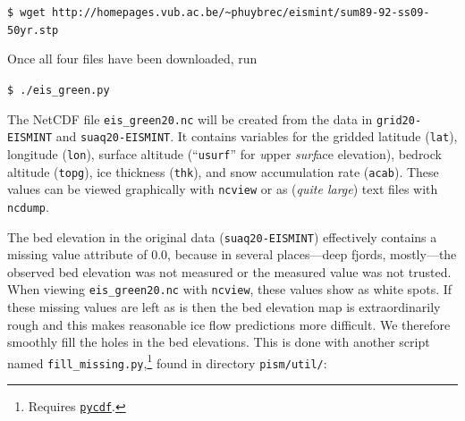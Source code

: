 \documentclass[11pt,final]{amsart}
\begin{document}
\verb|$ wget http://homepages.vub.ac.be/~phuybrec/eismint/sum89-92-ss09-50yr.stp|

\normalsize\noindent Once all four files have been downloaded, run

\verb|$ ./eis_green.py|

\noindent The NetCDF file \verb|eis_green20.nc| will be created from the data in \verb|grid20-EISMINT| and \verb|suaq20-EISMINT|.  It contains variables for the gridded latitude (\verb|lat|), longitude (\verb|lon|), surface altitude (``\verb|usurf|'' for \emph{u}pper \emph{surf}ace elevation), bedrock altitude (\verb|topg|), ice thickness (\verb|thk|), and snow accumulation rate (\verb|acab|).  These values can be viewed graphically with \verb|ncview| or as (\emph{quite large}) text files with \verb|ncdump|.

The bed elevation in the original data (\verb|suaq20-EISMINT|) effectively contains a missing value attribute of $0.0$, because in several places---deep fjords, mostly---the observed bed elevation was not measured or the measured value was not trusted.  When viewing \verb|eis_green20.nc| with \verb|ncview|, these values show as white spots.  If these missing values are left as is then the bed elevation map is extraordinarily rough and this makes reasonable ice flow predictions more difficult.  We therefore smoothly fill the holes in the bed elevations.  This is done with another script named \verb|fill_missing.py|,\footnote{Requires \href{http://pysclint.sourceforge.net/pycdf/}{\texttt{pycdf}}.} found in directory \verb|pism/util/|:
\end{document}
